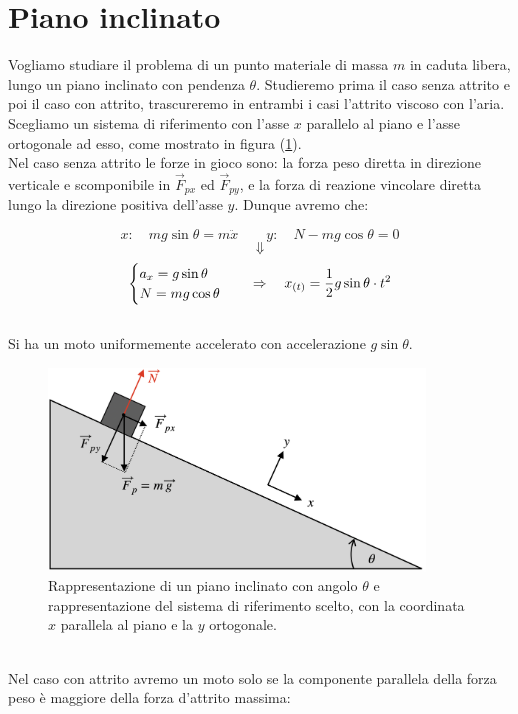 \section{Piano inclinato}
Vogliamo studiare il problema di un punto materiale di massa $m$ in caduta
libera, lungo un piano inclinato con pendenza $\theta$. Studieremo prima il
caso senza attrito e poi il caso con attrito, trascureremo in entrambi i
casi l'attrito viscoso con l'aria. \\
Scegliamo un sistema di riferimento con l'asse $x$ parallelo al piano e
l'asse ortogonale ad esso, come mostrato in figura (\ref{fig:Iplain&pendulum:Iplain}).
\\ Nel caso senza attrito le forze in gioco sono: la forza peso diretta in
direzione verticale e scomponibile in $\vec F_{px}$ ed $\vec F_{py}$, e la
forza di reazione vincolare diretta lungo la direzione positiva dell'asse $y$.
Dunque avremo che:

\begin{equation}
    x:\quad mg\sin\theta = m\ddot x\quad\quad y: \quad N - mg\cos\theta = 0
\end{equation}
$$\Downarrow$$
\begin{equation}
    \begin{cases}
        a_x = g\sin\theta\\
        N = mg\cos\theta
    \end{cases}
    \quad\Rightarrow\quad x_{(t)} = \frac12 g\sin\theta\cdot t^2
\end{equation}
\\
Si ha un moto uniformemente accelerato con accelerazione $g\sin\theta$.
\begin{figure}[htbp]
 \center
        \includegraphics[width=10cm]{images/pianoincl.png}
        \caption{Rappresentazione di un piano inclinato con angolo $\theta$ e
        rappresentazione del sistema di riferimento scelto, con la coordinata $x$
        parallela al piano e la $y$ ortogonale.}
\label{fig:Iplain&pendulum:Iplain}
\end{figure}
\\
Nel caso con attrito avremo un moto solo se la componente parallela della
forza peso è maggiore della forza d'attrito massima:

